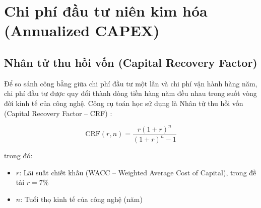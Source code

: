 \section{Chi phí đầu tư niên kim hóa (Annualized CAPEX)}

\subsection{Nhân tử thu hồi vốn (Capital Recovery Factor)}

Để so sánh công bằng giữa chi phí đầu tư một lần và chi phí vận hành hàng năm, chi phí đầu tư được quy đổi thành dòng tiền hàng năm đều nhau trong suốt vòng đời kinh tế của công nghệ. Công cụ toán học sử dụng là Nhân tử thu hồi vốn (Capital Recovery Factor -- CRF) \cite{brealey2020corporate}:

\begin{equation}
    \text{CRF}(r, n) = \frac{r(1+r)^n}{(1+r)^n - 1}
    \label{eq:crf}
\end{equation}

\noindent trong đó:
\begin{itemize}
    \item $r$: Lãi suất chiết khấu (WACC -- Weighted Average Cost of Capital), trong đề tài $r = 7\%$
    \item $n$: Tuổi thọ kinh tế của công nghệ (năm)
\end{itemize}

